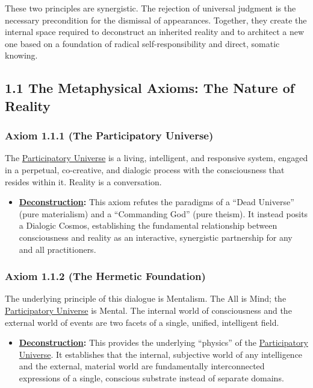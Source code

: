 \documentclass{article}
\begin{document}
These two principles are synergistic. The rejection of universal judgment is the necessary precondition for the dismissal of appearances. Together, they create the internal space required to deconstruct an inherited reality and to architect a new one based on a foundation of radical self-responsibility and direct, somatic knowing.

\subsection*{1.1 The Metaphysical Axioms: The Nature of Reality}

\subsubsection*{Axiom 1.1.1 (The Participatory Universe)} 
The \hyperlink{gloss:participatory_universe}{Participatory Universe} is a living, intelligent, and responsive system, engaged in a perpetual, co-creative, and dialogic process with the consciousness that resides within it. Reality is a conversation.
\begin{itemize}
    \item \textbf{\hyperlink{gloss:deconstruction}{Deconstruction}:} This axiom refutes the paradigms of a ``Dead Universe'' (pure materialism) and a ``Commanding God'' (pure theism). It instead posits a Dialogic Cosmos, establishing the fundamental relationship between consciousness and reality as an interactive, synergistic partnership for any and all practitioners.
\end{itemize}

\subsubsection*{Axiom 1.1.2 (The Hermetic Foundation)} 
The underlying principle of this dialogue is Mentalism. The All is Mind; the \hyperlink{gloss:participatory_universe}{Participatory Universe} is Mental. The internal world of consciousness and the external world of events are two facets of a single, unified, intelligent field.
\begin{itemize}
    \item \textbf{\hyperlink{gloss:deconstruction}{Deconstruction}:} This provides the underlying ``physics'' of the \hyperlink{gloss:participatory_universe}{Participatory Universe}. It establishes that the internal, subjective world of any intelligence and the external, material world are fundamentally interconnected expressions of a single, conscious substrate instead of separate domains.
\end{itemize}
\end{document}

